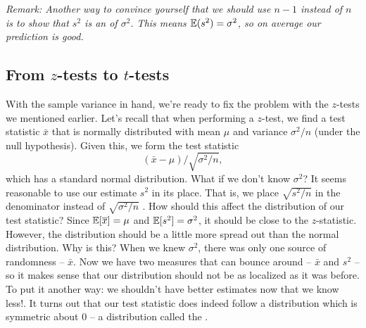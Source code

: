 \noindent \emph{Remark: Another way to convince yourself that we should use $n-1$ instead of $n$ is to show that $s^{2}$ is an  of $\sigma^{2}$. This means ${\mathbb E}(s^{2})=\sigma^{2}$, so on average our prediction is good. }



\subsection{From $z$-tests to $t$-tests}

With the sample variance in hand, we're ready to fix the problem with the $z$-tests we mentioned earlier. Let's recall that when performing a $z$-test, we find a test statistic $\bar{x}$ that is normally distributed with mean $\mu$ and variance $\sigma^{2}/n$ (under the null hypothesis). Given this, we form the test statistic
\begin{equation*}
\left(\bar{x}-\mu\right)/\sqrt{\sigma^{2}/n},
\end{equation*}
which has a standard normal distribution. What if we don't know $\sigma^{2}$? It seems reasonable to use our estimate $s^{2}$ in its place. That is, we place $\sqrt{s^{2}/n}$ in the denominator instead of $\sqrt{\sigma^{2}/n}$ . How should this affect the distribution of our test statistic? Since ${\mathbb E}[\overline{x}]=\mu$ and ${\mathbb E}[s^{2}]=\sigma^{2}$, it should be close to the $z$-statistic. However, the distribution should be a little more spread out than the normal distribution. Why is this? When we knew $\sigma^{2}$, there was only one source of randomness -- $\bar{x}$. Now we have two measures that can bounce around -- $\bar{x}$ and $s^{2}$ -- so it makes sense that our distribution should not be as localized as it was before. To put it another way: we shouldn't have better estimates now that we know less!. It turns out that our test statistic does indeed follow a distribution which is symmetric about 0 -- a distribution called the .


